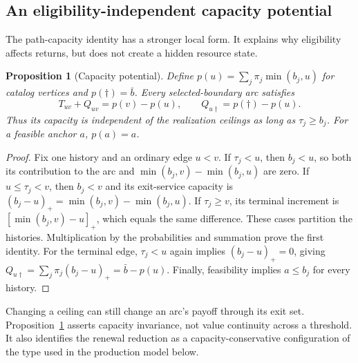 \documentclass[11pt,letterpaper]{article}
\newtheorem{proposition}[theorem]{Proposition}
\theoremstyle{definition}\newtheorem{remark}[theorem]{Remark}
\begin{document}
\subsection{An eligibility-independent capacity potential}
The path-capacity identity has a stronger local form. It explains why eligibility affects returns, but does not create a hidden resource state.
\begin{proposition}[Capacity potential]\label{prop:potential53}
Define $p(u)=\sum_j\pi_j\min(b_j,u)$ for catalog vertices and $p(\dagger)=\bar b$. Every selected-boundary arc satisfies
\begin{equation}\label{eq:potential53}
 T_{uv}+Q_{uv}=p(v)-p(u),\qquad Q_{u\dagger}=p(\dagger)-p(u).
\end{equation}
Thus its capacity is independent of the realization ceilings as long as $\tau_j\geq b_j$. For a feasible anchor $a$, $p(a)=a$.
\end{proposition}
\begin{proof}
Fix one history and an ordinary edge $u<v$. If $\tau_j<u$, then $b_j<u$, so both its contribution to the arc and $\min(b_j,v)-\min(b_j,u)$ are zero. If $u\leq\tau_j<v$, then $b_j<v$ and its exit-service capacity is $(b_j-u)_+=\min(b_j,v)-\min(b_j,u)$. If $\tau_j\geq v$, its terminal increment is $[\min(b_j,v)-u]_+$, which equals the same difference. These cases partition the histories. Multiplication by the probabilities and summation prove the first identity. For the terminal edge, $\tau_j<u$ again implies $(b_j-u)_+=0$, giving $Q_{u\dagger}=\sum_j\pi_j(b_j-u)_+=\bar b-p(u)$. Finally, feasibility implies $a\leq b_j$ for every history.
\end{proof}
Changing a ceiling can still change an arc's payoff through its exit set. Proposition~\ref{prop:potential53} asserts capacity invariance, not value continuity across a threshold. It also identifies the renewal reduction as a capacity-conservative configuration of the type used in the production model below.
\end{document}
